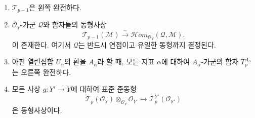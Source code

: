 \begin{theorem}[7.7.5]
\begin{enumerate}
  \item[b)] $\mathscr T_{p-1}$은 왼쪽 완전하다.

  \item[b$'$)] $\mathscr O_Y$-가군 $\mathscr Q$와 함자들의 동형사상
    \[
      \mathscr T_{p-1}(\mathscr M)
      \xrightarrow{\sim}
      \mathscr{H}\!om_{\mathscr O_Y}(\mathscr Q,\mathscr M).
      \tag{7.7.5.2}\label{III.7.7.5.2.fr}
    \]
    이 존재한다. 여기서 $\mathscr Q$는 반드시 연접이고 유일한 동형까지
    결정된다.

  \item[c)] 아핀 열린집합 $U_\alpha$의 환을 $A_\alpha$라 할 때,
    모든 지표 $\alpha$에 대하여 $A_\alpha$-가군의 함자
    $T_p^{A_\alpha}$는 오른쪽 완전하다.

  \item[d)] 모든 사상 $g:Y'\to Y$에 대하여 표준 준동형
    \[
      \mathscr T_p(\mathscr O_Y)
      \otimes_{\mathscr O_Y}\mathscr O_{Y'}
      \longrightarrow
      \mathscr T_p^{Y'}(\mathscr O_{Y'})
      \tag{7.7.5.3}\label{III.7.7.5.3.fr}
    \]
    은 동형사상이다.
\end{enumerate}
\end{theorem}


